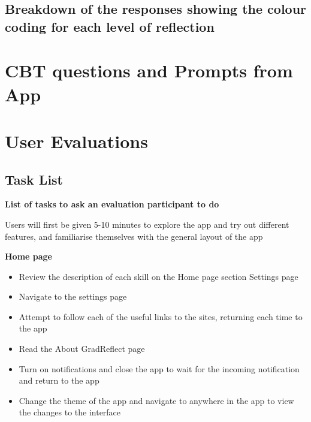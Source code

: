 \documentclass{l4proj}
\begin{document}
\begin{appendices}
\subsection{Breakdown of the responses showing the colour coding for each level of reflection}





\section{CBT questions and Prompts from App}







\section{User Evaluations} \label{Appendix-UserEvals}

\subsection{Task List}

\textbf{List of tasks to ask an evaluation participant to do}

Users will first be given 5-10 minutes to explore the app and try out different features, and familiarise themselves with the general layout of the app

\textbf{Home page}

\begin{itemize}
    \item Review the description of each skill on the Home page section Settings page
    \item Navigate to the settings page
    \item Attempt to follow each of the useful links to the sites, returning each time to the app
    \item Read the About GradReflect page
    \item Turn on notifications and close the app to wait for the incoming notification and return to the app
    \item Change the theme of the app and navigate to anywhere in the app to view the changes to the interface
\end{itemize}


\end{appendices}
\end{document}
